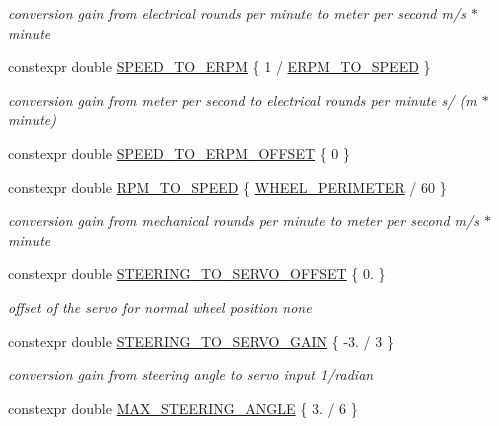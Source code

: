 \begin{DoxyCompactItemize}
\begin{DoxyCompactList}\small\item\em conversion gain from electrical rounds per minute to meter per second  m/s $\ast$ minute \end{DoxyCompactList}\item 
constexpr double \hyperlink{namespacecar__config_a0f37aa7e52366aebb006c6e1d3317900}{S\+P\+E\+E\+D\+\_\+\+T\+O\+\_\+\+E\+R\+PM} \{ 1 / \hyperlink{namespacecar__config_af33b95798967e7193927782fd91d36ce}{E\+R\+P\+M\+\_\+\+T\+O\+\_\+\+S\+P\+E\+ED} \}
\begin{DoxyCompactList}\small\item\em conversion gain from meter per second to electrical rounds per minute  s/ (m $\ast$ minute) \end{DoxyCompactList}\item 
constexpr double \hyperlink{namespacecar__config_a7f7bf8deb89d8360f3c07f9f9a0c7faf}{S\+P\+E\+E\+D\+\_\+\+T\+O\+\_\+\+E\+R\+P\+M\+\_\+\+O\+F\+F\+S\+ET} \{ 0 \}
\item 
constexpr double \hyperlink{namespacecar__config_aee034b6adfd7932f245bc94d869f2bb6}{R\+P\+M\+\_\+\+T\+O\+\_\+\+S\+P\+E\+ED} \{ \hyperlink{namespacecar__config_a46fe00906da07d2e030b586a634cd907}{W\+H\+E\+E\+L\+\_\+\+P\+E\+R\+I\+M\+E\+T\+ER} / 60 \}
\begin{DoxyCompactList}\small\item\em conversion gain from mechanical rounds per minute to meter per second  m/s $\ast$ minute \end{DoxyCompactList}\item 
constexpr double \hyperlink{namespacecar__config_abb6ef746663276219b321683dfbb8896}{S\+T\+E\+E\+R\+I\+N\+G\+\_\+\+T\+O\+\_\+\+S\+E\+R\+V\+O\+\_\+\+O\+F\+F\+S\+ET} \{ 0. \}
\begin{DoxyCompactList}\small\item\em offset of the servo for normal wheel position  none \end{DoxyCompactList}\item 
constexpr double \hyperlink{namespacecar__config_aa8ab85fe7b8ab728f34d15028f114d86}{S\+T\+E\+E\+R\+I\+N\+G\+\_\+\+T\+O\+\_\+\+S\+E\+R\+V\+O\+\_\+\+G\+A\+IN} \{ -\/3. / 3 \}
\begin{DoxyCompactList}\small\item\em conversion gain from steering angle to servo input  1/radian \end{DoxyCompactList}\item 
constexpr double \hyperlink{namespacecar__config_a967b325af26effe80fbbc64dc68a36a0}{M\+A\+X\+\_\+\+S\+T\+E\+E\+R\+I\+N\+G\+\_\+\+A\+N\+G\+LE} \{ 3. / 6 \}

\end{DoxyCompactItemize}
